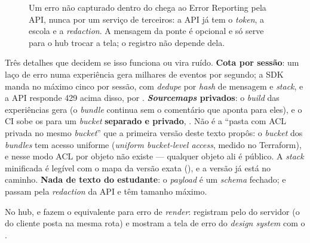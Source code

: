 \begin{figure}[H]
{}
\caption[Erro de cliente entra pela API]{Um erro não capturado dentro do
   chega ao Error Reporting pela API, nunca por um serviço de
  terceiros: a API já tem o \emph{token}, a escola e a \emph{redaction}. A
  mensagem  da ponte é opcional e só serve para o hub trocar a
  tela; o registro não depende dela.}
\label{fig:seq-erro-cliente}
\end{figure}

Três detalhes que decidem se isso funciona ou vira ruído. \textbf{Cota por
sessão}: um laço de erro numa experiência gera milhares de eventos por
segundo; a SDK manda no máximo cinco por sessão, com \emph{dedupe} por
\emph{hash} de mensagem e \emph{stack}, e a API responde 429 acima disso,
por . \textbf{\emph{Sourcemaps} privados}: o
\emph{build} das experiências gera  (o
\emph{bundle} continua sem o comentário que aponta para eles), e o CI sobe os
 para um \emph{bucket} \textbf{separado e privado},
. Não é a
\enquote{pasta  com ACL privada no mesmo \emph{bucket}} que a
primeira versão deste texto propôs: o \emph{bucket} dos \emph{bundles} tem
acesso uniforme (\emph{uniform bucket-level access}, medido no Terraform), e
nesse modo ACL por objeto não existe --- qualquer objeto ali é público. A
\emph{stack} minificada é legível com o mapa da versão exata
(), e a versão já está no caminho. \textbf{Nada de texto do estudante}: o \emph{payload} é um
\emph{schema} fechado;  e  passam pela
\emph{redaction} da API e têm tamanho máximo.

No hub,  e  fazem o equivalente para
erro de \emph{render}: registram pelo  do servidor (o
 do cliente posta na mesma rota) e mostram a tela de erro do
\emph{design system} com o .

